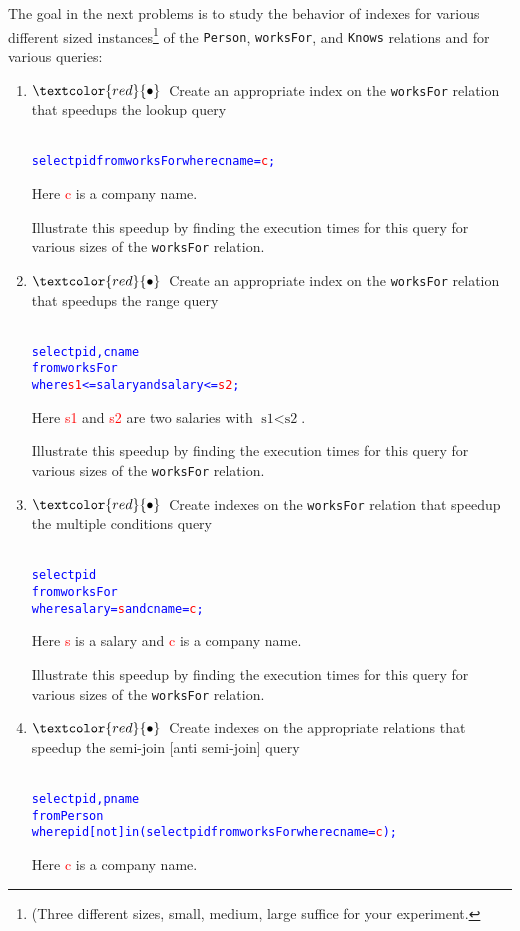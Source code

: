 \documentclass{article}
\newcommand{\redbullet}{$\textcolor{red}{\bullet}$}
\newcommand{\red}[1]{\textcolor{red}#1}
\begin{document}
\newpage
The goal in the next problems is to study the behavior of indexes for various different sized instances\footnote{(Three different sizes, small, medium, large suffice for your experiment.} of the {\tt Person}, {\tt worksFor}, and {\tt Knows} relations
and for various queries:
\begin{enumerate}[resume]
\item \redbullet\  Create an appropriate index on the {\tt worksFor} relation that speedups the lookup query
\begin{alltt}\textcolor{blue}{
select pid from worksFor where cname = \red{c};}
\end{alltt}
Here \textcolor{red}{c} is a company name.

Illustrate this speedup by finding the execution times for this query for various sizes of the {\tt worksFor} relation.  
\item \redbullet\  Create an appropriate index on the {\tt worksFor} relation that speedups the range query
\begin{alltt}\textcolor{blue}{
select pid, cname
from   worksFor
where  \textcolor{red}{s1} <= salary and salary <= \textcolor{red}{s2};}
\end{alltt}
Here \textcolor{red}{s1} and \textcolor{red}{s2} are two salaries with $\text{s1} < \text{s2}$.

Illustrate this speedup by finding the execution times for this query for various sizes of the {\tt worksFor} relation.
\item \redbullet\  Create indexes on the {\tt worksFor} relation that speedup the multiple conditions query
\begin{alltt}\textcolor{blue}{
select pid
from   worksFor
where  salary = \red{s} and cname = \red{c};}
\end{alltt}

Here \textcolor{red}{s} is a salary and \textcolor{red}{c} is a company name.

Illustrate this speedup by finding the execution times for this query for various sizes of the {\tt worksFor} relation.
\item \redbullet\  Create indexes on the appropriate relations that speedup the semi-join [anti semi-join] query
\begin{alltt}\textcolor{blue}{
select pid, pname 
from   Person 
where  pid [not] in (select pid from worksFor where cname = \red{c});}
\end{alltt}

Here \textcolor{red}{c} is a company name.


\end{enumerate}
\end{document}

